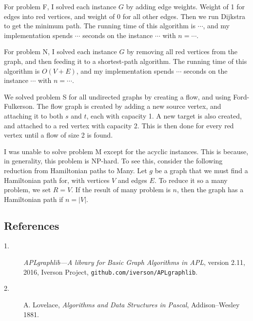 \documentclass{tufte-handout}
\begin{document}
For problem F, I solved each instance $G$ by adding edge weights. Weight of 1 for edges into red vertices, and weight of 0 for all other edges. Then we run Dijkstra to get the minimum path.
The running time of this algorithm is $\cdots$, and my implementation spends $\cdots$ seconds on the instance $\cdots$ with  $n=\cdots$.

For problem N, I solved each instance $G$ by removing all red vertices from the graph, and then feeding it to a shortest-path algorithm.
The running time of this algorithm is $O(V + E)$, and my implementation spends $\cdots$ seconds on the instance $\cdots$ with  $n=\cdots$.

We solved problem S for all undirected graphs by creating a flow, and using Ford-Fulkerson. The flow graph is created by adding a new source vertex, and attaching it to both $s$ and $t$, each with capacity 1. A new target is also created, and attached to a red vertex with capacity 2. This is then done for every red vertex until a flow of size 2 is found.

I was unable to solve problem M except for the acyclic instances.
This is because, in generality, this problem is NP-hard. 
To see this, consider the following reduction from Hamiltonian paths to Many.
Let $g$ be a graph that we must find a Hamiltonian path for, with vertices $V$ and edges $E$. To reduce it so a many problem, we set $R = V$. If the result of many problem is $n$, then the graph has a Hamiltonian path if $n = |V|$.

\subsection{References}
\begin{description}
  \item[1.] \emph{APLgraphlib---A library for Basic Graph Algorithms in APL}, version 2.11, 2016, Iverson Project, {\tt github.com/iverson/APLgraphlib}.

  \item[2.] A. Lovelace, \emph{Algorithms and Data Structures in Pascal}, Addison--Wesley 1881. 
\end{description}
\end{document}

